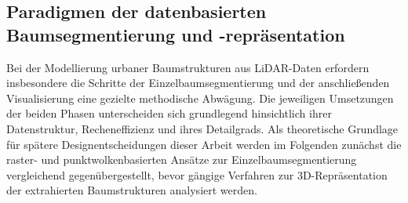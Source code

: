 \subsection{Paradigmen der datenbasierten Baumsegmentierung und -repräsentation}

Bei der Modellierung urbaner Baumstrukturen aus LiDAR-Daten erfordern insbesondere die Schritte der Einzelbaumsegmentierung und der anschließenden Visualisierung eine gezielte methodische Abwägung. Die jeweiligen Umsetzungen der beiden Phasen unterscheiden sich grundlegend hinsichtlich ihrer Datenstruktur, Recheneffizienz und ihres Detailgrads. Als theoretische Grundlage für spätere Designentscheidungen dieser Arbeit werden im Folgenden zunächst die raster- und punktwolkenbasierten Ansätze zur Einzelbaumsegmentierung vergleichend gegenübergestellt, bevor gängige Verfahren zur 3D-Repräsentation der extrahierten Baumstrukturen analysiert werden.